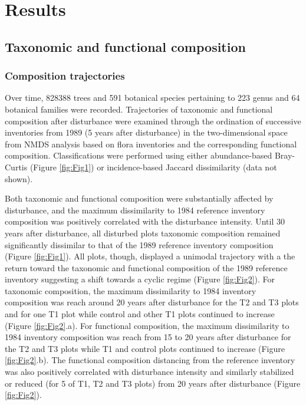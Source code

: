 \documentclass[fleqn,10pt]{ArtEcoFoG} %
\theoremstyle{definition}
\theoremstyle{definition}
\theoremstyle{definition}
\theoremstyle{remark}
\begin{document}
\section{Results}\label{results}

\subsection{Taxonomic and functional
composition}\label{taxonomic-and-functional-composition}

\subsubsection{Composition trajectories}\label{composition-trajectories}

Over time, 828388 trees and 591 botanical species pertaining to 223
genus and 64 botanical families were recorded. Trajectories of taxonomic
and functional composition after disturbance were examined through the
ordination of successive inventories from 1989 (5 years after
disturbance) in the two-dimensional space from NMDS analysis based on
flora inventories and the corresponding functional composition.
Classifications were performed using either abundance-based Bray-Curtis
(Figure \ref{fig:Fig1}) or incidence-based Jaccard dissimilarity (data
not shown).

Both taxonomic and functional composition were substantially affected by
disturbance, and the maximum dissimilarity to 1984 reference inventory
composition was positively correlated with the disturbance intensity.
Until 30 years after disturbance, all disturbed plots taxonomic
composition remained significantly dissimilar to that of the 1989
reference inventory composition (Figure \ref{fig:Fig1}). All plots,
though, displayed a unimodal trajectory with a the return toward the
taxonomic and functional composition of the 1989 reference inventory
suggesting a shift towards a cyclic regime (Figure \ref{fig:Fig2}). For
taxonomic composition, the maximum dissimilarity to 1984 inventory
composition was reach around 20 years after disturbance for the T2 and
T3 plots and for one T1 plot while control and other T1 plots continued
to increase (Figure \ref{fig:Fig2}.a). For functional composition, the
maximum dissimilarity to 1984 inventory composition was reach from 15 to
20 years after disturbance for the T2 and T3 plots while T1 and control
plots continued to increase (Figure \ref{fig:Fig2}.b). The functional
composition distancing from the reference inventory was also positively
correlated with disturbance intensity and similarly stabilized or
reduced (for 5 of T1, T2 and T3 plots) from 20 years after disturbance
(Figure \ref{fig:Fig2}).
\end{document}
